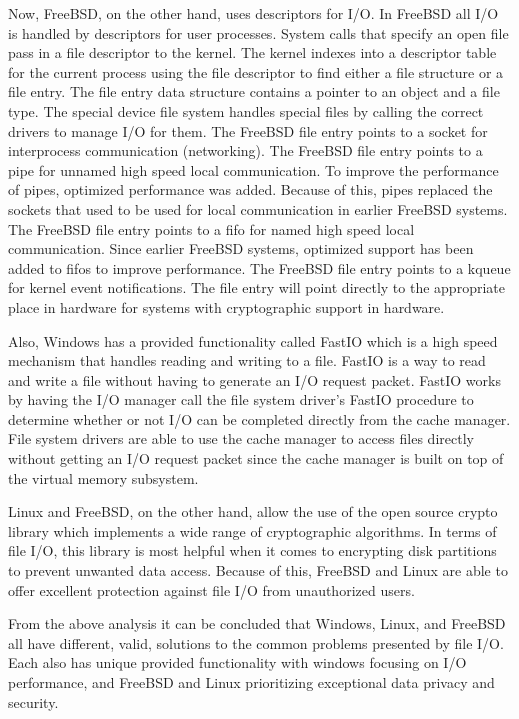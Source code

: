 \documentclass[letterpaper,10pt,onecolumn,draftclsnofoot,]{article}
\begin{document}
Now, FreeBSD, on the other hand, uses descriptors for I/O. In FreeBSD all I/O is handled by descriptors for user processes. System calls that specify an open file pass in a file descriptor to the kernel. The kernel indexes into a descriptor table for the current process using the file descriptor to find either a file structure or a file entry. The file entry data structure contains a pointer to an object and a file type. The special device file system handles special files by calling the correct drivers to manage I/O for them. The FreeBSD file entry points to a socket for interprocess communication (networking). The FreeBSD file entry points to a pipe for unnamed high speed local communication. To improve the performance of pipes, optimized performance was added. Because of this, pipes replaced the sockets that used to be used for local communication in earlier FreeBSD systems. The FreeBSD file entry points to a fifo for named high speed local communication. Since earlier FreeBSD systems, optimized support has been added to fifos to improve performance. The FreeBSD file entry points to a kqueue for kernel event notifications. The file entry will point directly to the appropriate place in hardware for systems with cryptographic support in hardware.

Also, Windows has a provided functionality called FastIO which is a high speed mechanism that handles reading and writing to a file. FastIO is a way to read and write a file without having to generate an I/O request packet. FastIO works by having the I/O manager call the file system driver's FastIO procedure to determine whether or not I/O can be completed directly from the cache manager. File system drivers are able to use the cache manager to access files directly without getting an I/O request packet since the cache manager is built on top of the virtual memory subsystem. 

Linux and FreeBSD, on the other hand, allow the use of the open source crypto library which implements a wide range of cryptographic algorithms. In terms of file I/O, this library is most helpful when it comes to encrypting disk partitions to prevent unwanted data access. Because of this, FreeBSD and Linux are able to offer excellent protection against file I/O from unauthorized users.

From the above analysis it can be concluded that Windows, Linux, and FreeBSD all have different, valid, solutions to the common problems presented by file I/O. Each also has unique provided functionality with windows focusing on I/O performance, and FreeBSD and Linux prioritizing exceptional data privacy and security.
\end{document}
